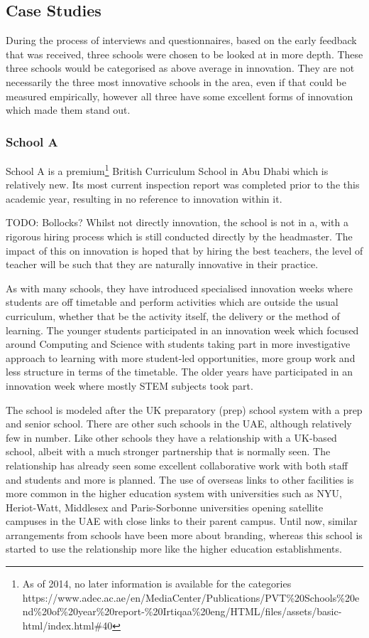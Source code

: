 \subsection{Case Studies}
During the process of interviews and questionnaires, based on the early feedback that was received, three schools were chosen to be looked at in more depth. These three schools would be categorised as above average in innovation. They are not necessarily the three most innovative schools in the area, even if that could be measured empirically, however all three have some excellent forms of innovation which made them stand out.

\subsubsection{School A}
School A is a premium\footnote{As of 2014, no later information is available for the categories https://www.adec.ac.ae/en/MediaCenter/Publications/PVT\%20Schools\%20end\%20of\%20year\%20report-\%20Irtiqaa\%20eng/HTML/files/assets/basic-html/index.html\#40} British Curriculum School in Abu Dhabi which is relatively new. Its most current inspection report was completed prior to the this academic year, resulting in no reference to innovation within it.

TODO: Bollocks?
Whilst not directly innovation, the school is not in a, with a rigorous hiring process which is still conducted directly by the headmaster. The impact of this on innovation is hoped that by hiring the best teachers, the level of teacher will be such that they are naturally innovative in their practice.

As with many schools, they have introduced specialised innovation weeks where students are off timetable and perform activities which are outside the usual curriculum, whether that be the activity itself, the delivery or the method of learning. The younger students participated in an innovation week which focused around Computing and Science with students taking part in more investigative approach to learning with more student-led opportunities, more group work and less structure in terms of the timetable. The older years have participated in an innovation week where mostly STEM subjects took part.

The school is modeled after the UK preparatory (prep) school system with a prep and senior school. There are other such schools in the UAE, although relatively few in number. Like other schools they have a relationship with a UK-based school, albeit with a much stronger partnership that is normally seen. The relationship has already seen some excellent collaborative work with both staff and students and  more is planned. The use of overseas links to other facilities is more common in the higher education system with universities such as NYU, Heriot-Watt, Middlesex and Paris-Sorbonne universities opening satellite campuses in the UAE with close links to their parent campus. Until now, similar arrangements from schools have been more about branding, whereas this school is started to use the relationship more like the higher education establishments.

